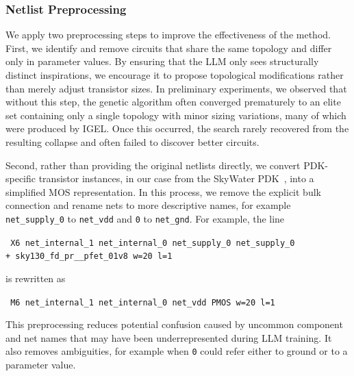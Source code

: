 \documentclass[sigconf,pbalance]{acmart_modified}
\begin{document}
\subsubsection*{Netlist Preprocessing}
We apply two preprocessing steps to improve the effectiveness of the method. First, we identify and remove circuits that share the same topology and differ only in parameter values. By ensuring that the LLM only sees structurally distinct inspirations, we encourage it to propose topological modifications rather than merely adjust transistor sizes. In preliminary experiments, we observed that without this step, the genetic algorithm often converged prematurely to an elite set containing only a single topology with minor sizing variations, many of which were produced by IGEL. Once this occurred, the search rarely recovered from the resulting collapse and often failed to discover better circuits.

Second, rather than providing the original netlists directly, we convert PDK-specific transistor instances, in our case from the SkyWater PDK~\cite{skywater130pdk}, into a simplified MOS representation. In this process, we remove the explicit bulk connection and rename nets to more descriptive names, for example \texttt{net\_supply\_0} to \texttt{net\_vdd} and \texttt{0} to \texttt{net\_gnd}. For example, the line

\vspace{0.1cm}
\noindent
\colorbox{gray!15}{%
  \parbox{0.99\linewidth}{%
    \small\texttt{%
      X6 net\_internal\_1 net\_internal\_0 net\_supply\_0 net\_supply\_0\\
      + sky130\_fd\_pr\_\_pfet\_01v8 w=20 l=1%
    }%
  }%
}

\vspace{0.2cm}
\noindent is rewritten as
\vspace{0.2cm}

\noindent
\colorbox{gray!15}{%
  \parbox{0.99\linewidth}{%
    \small\texttt{%
      M6 net\_internal\_1 net\_internal\_0 net\_vdd PMOS w=20 l=1%
    }%
  }%
}
\vspace{-0.2cm}

\noindent This preprocessing reduces potential confusion caused by uncommon component and net names that may have been underrepresented during LLM training. It also removes ambiguities, for example when \texttt{0} could refer either to ground or to a parameter value.
\end{document}
